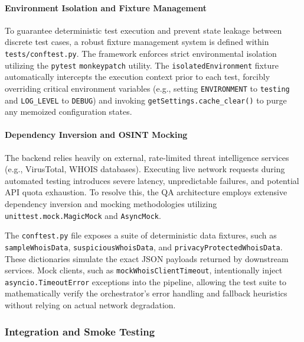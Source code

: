 \paragraph{Environment Isolation and Fixture
Management}\label{environment-isolation-and-fixture-management}

To guarantee deterministic test execution and prevent state leakage
between discrete test cases, a robust fixture management system is
defined within \texttt{tests/conftest.py}. The framework enforces strict
environmental isolation utilizing the \texttt{pytest}
\texttt{monkeypatch} utility. The \texttt{isolatedEnvironment} fixture
automatically intercepts the execution context prior to each test,
forcibly overriding critical environment variables (e.g., setting
\texttt{ENVIRONMENT} to \texttt{testing} and \texttt{LOG\_LEVEL} to
\texttt{DEBUG}) and invoking \texttt{getSettings.cache\_clear()} to
purge any memoized configuration states.

\paragraph{Dependency Inversion and OSINT
Mocking}\label{dependency-inversion-and-osint-mocking}

The backend relies heavily on external, rate-limited threat intelligence
services (e.g., VirusTotal, WHOIS databases). Executing live network
requests during automated testing introduces severe latency,
unpredictable failures, and potential API quota exhaustion. To resolve
this, the QA architecture employs extensive dependency inversion and
mocking methodologies utilizing \texttt{unittest.mock.MagicMock} and
\texttt{AsyncMock}.

The \texttt{conftest.py} file exposes a suite of deterministic data
fixtures, such as \texttt{sampleWhoisData},
\texttt{suspiciousWhoisData}, and \texttt{privacyProtectedWhoisData}.
These dictionaries simulate the exact JSON payloads returned by
downstream services. Mock clients, such as
\texttt{mockWhoisClientTimeout}, intentionally inject
\texttt{asyncio.TimeoutError} exceptions into the pipeline, allowing the
test suite to mathematically verify the orchestrator's error handling
and fallback heuristics without relying on actual network degradation.

\subsubsection{Integration and Smoke
Testing}\label{integration-and-smoke-testing}

